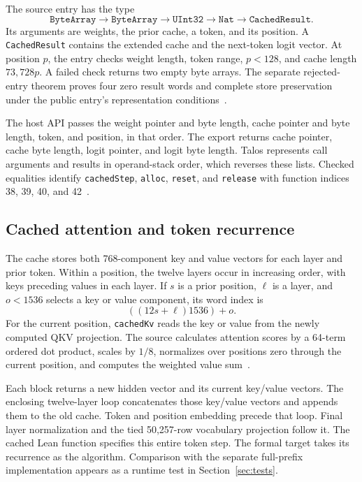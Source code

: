 \documentclass[11pt]{article}
\newcommand{\code}[1]{\texttt{#1}}
\begin{document}
The source entry has the type
\[
\code{ByteArray}\to\code{ByteArray}\to\code{UInt32}\to\code{Nat}\to\code{CachedResult}.
\]
Its arguments are weights, the prior cache, a token, and its position.  A \code{CachedResult} contains the extended cache and the next-token logit vector.  At position $p$, the entry checks weight length, token range, $p<128$, and cache length $73{,}728p$.  A failed check returns two empty byte arrays.  The separate rejected-entry theorem proves four zero result words and complete store preservation under the public entry's representation conditions~\cite{entry}.

The host API passes the weight pointer and byte length, cache pointer and byte length, token, and position, in that order.  The export returns cache pointer, cache byte length, logit pointer, and logit byte length.  Talos represents call arguments and results in operand-stack order, which reverses these lists.  Checked equalities identify \code{cachedStep}, \code{alloc}, \code{reset}, and \code{release} with function indices 38, 39, 40, and 42~\cite{initialize}.

\subsection{Cached attention and token recurrence}

The cache stores both 768-component key and value vectors for each layer and prior token.  Within a position, the twelve layers occur in increasing order, with keys preceding values in each layer.  If $s$ is a prior position, $\ell$ is a layer, and $o<1536$ selects a key or value component, its word index is
\[
((12s+\ell)1536)+o.
\]
For the current position, \code{cachedKv} reads the key or value from the newly computed QKV projection.  The source calculates attention scores by a 64-term ordered dot product, scales by $1/8$, normalizes over positions zero through the current position, and computes the weighted value sum~\cite{cached}.

Each block returns a new hidden vector and its current key/value vectors.  The enclosing twelve-layer loop concatenates those key/value vectors and appends them to the old cache.  Token and position embedding precede that loop.  Final layer normalization and the tied 50,257-row vocabulary projection follow it.  The cached Lean function specifies this entire token step.  The formal target takes its recurrence as the algorithm.  Comparison with the separate full-prefix implementation appears as a runtime test in Section~\ref{sec:tests}.
\end{document}
